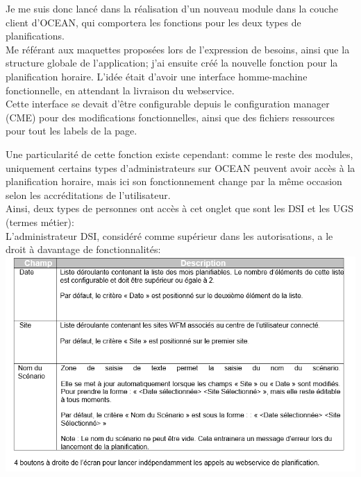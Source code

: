 \documentclass{rapport}
\begin{document}
\begin{minipage}{0.35\textwidth}
\end{minipage}
\begin{minipage}{0.55\textwidth}
Je me suis donc lancé dans la réalisation d'un nouveau module dans la couche client d'OCEAN, qui comportera les fonctions pour les deux types de planifications.\\
Me référant aux maquettes proposées lors de l'expression de besoins, ainsi que la structure globale de l'application; j'ai ensuite créé la nouvelle fonction pour la planification horaire. L'idée était d'avoir une interface homme-machine fonctionnelle, en attendant la livraison du webservice.\\

Cette interface se devait d'être configurable depuis le configuration manager (CME) pour des modifications fonctionnelles, ainsi que des fichiers ressources pour tout les labels de la page.
\end{minipage}
\vspace{5mm} %

Une particularité de cette fonction existe cependant: comme le reste des modules, uniquement certains types d'administrateurs sur OCEAN peuvent avoir accès à la planification horaire, mais ici son fonctionnement change par la même occasion selon les accréditations de l'utilisateur.\\
Ainsi, deux types de personnes ont accès à cet onglet que sont les DSI et les UGS (termes métier):\\

L'administrateur DSI, considéré comme supérieur dans les autorisations, a le droit à davantage de fonctionnalités:\\
\includegraphics[width=.95\textwidth]{fig/fig18_PlanoHDSIFonct.png}
\end{document}
